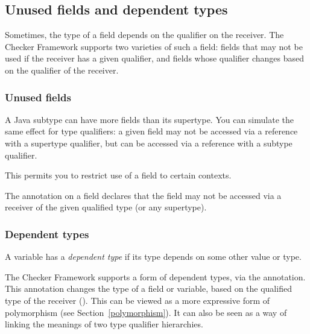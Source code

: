 



\subsection{Unused fields and dependent types}

Sometimes, the type of a field depends on the qualifier on the receiver.
The Checker Framework supports two varieties of such a field:  fields that
may not be used if the receiver has a given qualifier, and fields whose
qualifier changes based on the qualifier of the receiver.


\subsubsection{Unused fields\label{unused-fields}}

A Java subtype can have more fields than its supertype.  You can simulate
the same effect for type qualifiers:  a given field may not be accessed via
a reference with a supertype qualifier, but can be accessed via a reference
with a subtype qualifier.

This permits you to restrict use of a field to certain contexts.

The  annotation
on a field declares that the field may not be accessed via a receiver of
the given qualified type (or any supertype).


\subsubsection{Dependent types\label{dependent-types}}

A variable has a \emph{dependent type} if its type depends on some other
value or type.

The Checker Framework supports a form of dependent types, via the
 annotation.
This annotation changes the type of a field or variable, based on the
qualified type of the receiver ().  This can be viewed as a more
expressive form of polymorphism (see Section~\ref{polymorphism}).  It can
also be seen as a way of linking the meanings of two type qualifier
hierarchies.

